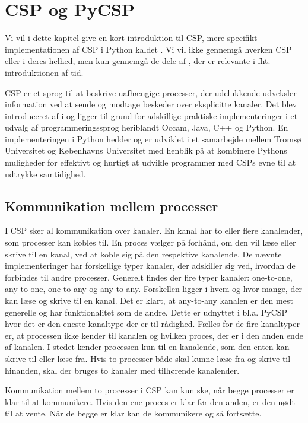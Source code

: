 \chapter{CSP og PyCSP}\label{chap:csp}
\thispagestyle{empty}
Vi vil i dette kapitel give en kort introduktion til CSP, mere specifikt implementationen af CSP i Python kaldet \pycsp. Vi vil ikke gennemgå hverken CSP eller \pycsp i deres helhed, men kun gennemgå de dele af \pycsp, der er relevante i fht. introduktionen af tid. 

CSP er et sprog til at beskrive uafhængige processer, der udelukkende udveksler information ved at sende og modtage beskeder over eksplicitte kanaler. Det blev introduceret af \citeauthor{hoare-csp} i \cite{hoare-csp} og ligger til grund for adskillige praktiske implementeringer i et udvalg af programmeringssprog heriblandt Occam, Java, C++ og Python\cite{May1983, jcsp, Brown2007, pycsp}. En implementeringen i Python hedder \pycsp og er udviklet i et samarbejde mellem Tromsø Universitet og Københavns Universitet med henblik på at kombinere  Pythons muligheder  for effektivt og hurtigt at udvikle programmer med CSPs evne til at udtrykke samtidighed\cite{pycsp}. 

\section{Kommunikation mellem processer}
I CSP sker al kommunikation over kanaler. En kanal har to eller flere kanalender, som processer kan kobles til. En proces vælger på forhånd, om den vil læse eller skrive til en kanal, ved at koble sig på den respektive kanalende. De nævnte implementeringer har forskellige typer kanaler, der adskiller sig ved,  hvordan de forbindes til andre processer. Generelt findes der fire typer kanaler: one-to-one, any-to-one, one-to-any og any-to-any. Forskellen ligger i hvem og hvor mange, der kan læse og skrive til en kanal. Det er klart, at any-to-any kanalen er den mest generelle og har funktionalitet som de andre. Dette er udnyttet i bl.a. PyCSP hvor det er den eneste kanaltype der er til rådighed. Fælles for de fire kanaltyper er, at processen ikke kender til kanalen og hvilken proces, der er i den anden ende af kanalen. I stedet kender processen kun til en  kanalende, som  den enten kan skrive til eller læse fra. Hvis to processer både skal kunne læse fra og skrive til hinanden, skal der bruges to kanaler med tilhørende kanalender. 

Kommunikation mellem to processer i CSP kan kun ske, når begge processer er klar til at kommunikere. Hvis den ene proces er klar før den anden, er den nødt til at vente. Når de begge er klar kan de kommunikere og så fortsætte.

